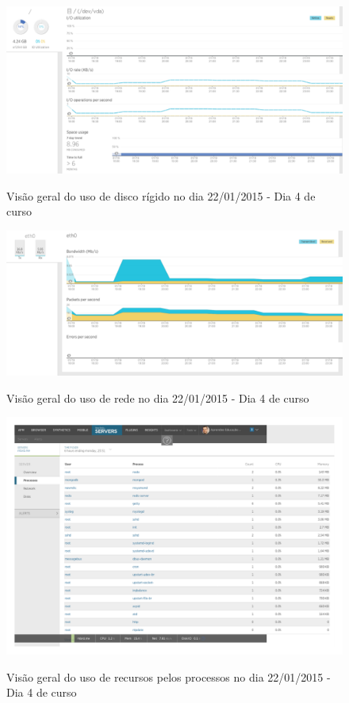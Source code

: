 \documentclass[
	12pt,				%
	oneside,			%
	a4paper,			%
	english,			%
	brazil				%
	]{abntex2ppgsi}
\begin{document}
\begin{apendicesenv}
\begin{figure}[h]
\centering
\caption{Visão geral do uso de disco rígido no dia 22/01/2015 - Dia 4 de curso}
\includegraphics[width=1.0\textwidth]{relatorios/22-01-15/disk_cropped.pdf} 
\label{fig:recursos_dia1_2} 
\end{figure}

\begin{figure}[h]
\centering
\caption{Visão geral do uso de rede no dia 22/01/2015 - Dia 4 de curso}
\includegraphics[width=1.0\textwidth]{relatorios/22-01-15/network_cropped.pdf} 
\label{fig:recursos_dia1_3} 
\end{figure}

\begin{figure}[h]
\centering
\caption{Visão geral do uso de recursos pelos processos no dia 22/01/2015 - Dia 4 de curso}
\includegraphics[page=2,width=1.0\textwidth]{relatorios/22-01-15/process-inspector_cropped.pdf} 
\label{fig:recursos_dia1_5} 
\end{figure}




\end{apendicesenv}
\end{document}
